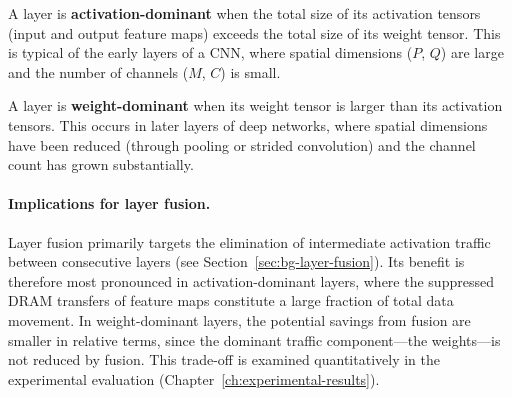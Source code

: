 \begin{definition}
A layer is \textbf{activation-dominant} when the total size of its
activation tensors (input and output feature maps) exceeds the total
size of its weight tensor.
This is typical of the early layers of a CNN, where spatial dimensions
($P$, $Q$) are large and the number of channels ($M$, $C$) is small.
\end{definition}

\begin{definition}
A layer is \textbf{weight-dominant} when its weight tensor is
larger than its activation tensors.
This occurs in later layers of deep networks, where spatial dimensions
have been reduced (through pooling or strided convolution) and the
channel count has grown substantially.
\end{definition}

\paragraph{Implications for layer fusion.}
Layer fusion primarily targets the elimination of intermediate
activation traffic between consecutive layers
(see Section~\ref{sec:bg-layer-fusion}).
Its benefit is therefore most pronounced in activation-dominant layers,
where the suppressed DRAM transfers of feature maps constitute a large
fraction of total data movement.
In weight-dominant layers, the potential savings from fusion are smaller
in relative terms, since the dominant traffic component---the
weights---is not reduced by fusion.
This trade-off is examined quantitatively in the experimental
evaluation (Chapter~\ref{ch:experimental-results}).
